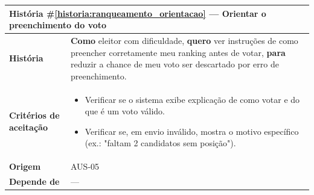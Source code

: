 \documentclass[12pt,a4paper]{article}
\newcounter{historia}
\begin{document}
\label{historia:ranqueamento_orientacao}
\begin{table}[H]
    \centering
    \begin{tabular}{|m{4.5cm} | m{11cm}|}
    \hline
    
    \multicolumn{2}{|l|}{\textbf{História \#\ref{historia:ranqueamento_orientacao} --- Orientar o preenchimento do voto}} \\
    
    \hline  \textbf{História} &
    \textbf{Como} eleitor com dificuldade, \newline
    \textbf{quero} ver instruções de como preencher corretamente meu ranking antes de votar, \newline  
    \textbf{para} reduzir a chance de meu voto ser descartado por erro de preenchimento. \\
    
    \textbf{Critérios de aceitação} &
    \begin{itemize}
        \item{Verificar se o sistema exibe explicação de como votar e do que é um voto válido.}
        \item{Verificar se, em envio inválido, mostra o motivo específico (ex.: "faltam 2 candidatos sem posição").}
    \end{itemize}\\
    
    
    \textbf{Origem} &
    AUS-05 \\
    
    \textbf{Depende de} &
    --- \\
    
    \hline
    \end{tabular}
\end{table}
\end{document}
